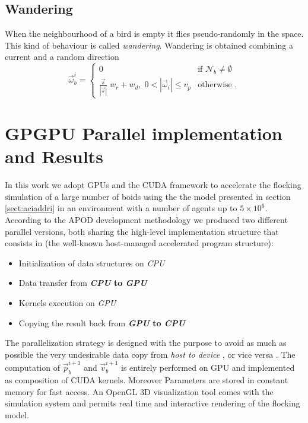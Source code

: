 \subsection{Wandering}
When the neighbourhood  of a bird is empty it flies pseudo-randomly in the space. This kind of behaviour is called \textit{wandering}. 
Wandering is obtained combining a current and a random direction 
\begin{equation*}
\vec{\omega}_b^i =  
\begin{cases} 
0 &\mbox{if } \mathcal{N}_b \neq \emptyset \\ 
\frac{\vec{s}}{|\vec{s}|}\;w_r+w_d,\; 0 < |\vec{\omega}_i| \leq v_p & \mbox{otherwise }. 
\end{cases}
\end{equation*}



\section{GPGPU Parallel implementation and Results}
\label{sect:gpuimplementation}
In this work we adopt GPUs and the CUDA framework to accelerate the flocking
simulation of a large number of boids using the the model presented in section
\ref{sect:aciaddri} in an environment with a number of agents up to $5
\times10^6$.
According to the APOD development methodology we produced two different parallel
versions, both sharing the high-level implementation structure that consists in
(the well-known host-managed accelerated program structure):
\begin{itemize}
	\item Initialization of data structures on \emph{CPU}
	\item Data transfer from \textbf{\emph{CPU} to \emph{GPU}}
	\item Kernels execution on \emph{GPU}
	\item Copying the result back from \textbf{\emph{GPU} to \emph{CPU}}
\end{itemize}
The parallelization strategy is designed with the purpose to avoid as much
as possible the very undesirable data copy from \emph{host to device}  , or vice versa\cite{CUDA3} \cite{Spataro} \cite{Dambrosio}.
The computation of $\vec{p}_b^{i+1}$ and $\vec{v}_b^{i+1}$ is entirely performed on GPU and implemented as composition of CUDA kernels. Moreover Parameters are stored in constant memory for fast access.
An OpenGL 3D visualization tool comes with the simulation system and permits real time and interactive 
rendering of the flocking model.

